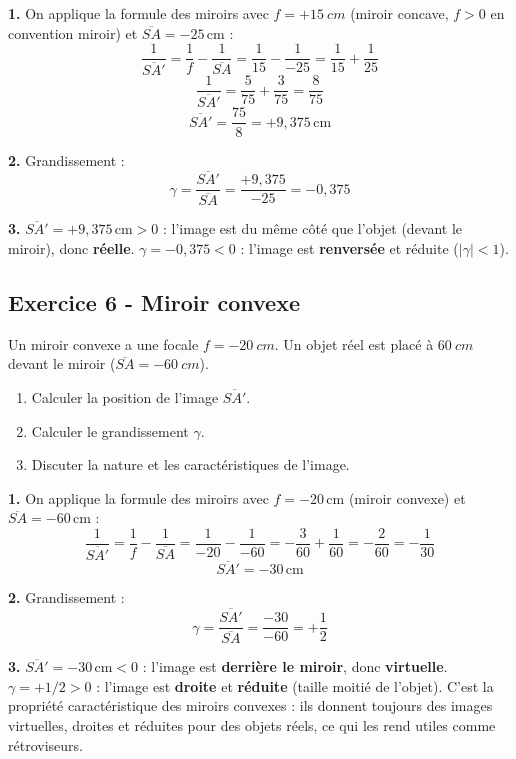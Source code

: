 \documentclass[12pt,a4paper]{article}
\begin{document}
\begin{boitecorrige}
\textbf{1.} On applique la formule des miroirs avec $f = +\qty{15}{cm}$ (miroir concave, $f > 0$ en convention miroir) et $\overline{SA} = -25\,\text{cm}$ :
\[
\frac{1}{\overline{SA'}} = \frac{1}{f} - \frac{1}{\overline{SA}} = \frac{1}{15} - \frac{1}{-25} = \frac{1}{15} + \frac{1}{25}
\]
\[
\frac{1}{\overline{SA'}} = \frac{5}{75} + \frac{3}{75} = \frac{8}{75}
\]
\[
\overline{SA'} = \frac{75}{8} = +9{,}375\,\text{cm}
\]

\textbf{2.} Grandissement :
\[
\gamma = \frac{\overline{SA'}}{\overline{SA}} = \frac{+9{,}375}{-25} = -0{,}375
\]

\textbf{3.} $\overline{SA'} = +9{,}375\,\text{cm} > 0$ : l'image est du même côté que l'objet (devant le miroir), donc \textbf{réelle}. $\gamma = -0{,}375 < 0$ : l'image est \textbf{renversée} et réduite ($|\gamma| < 1$).
\end{boitecorrige}

\subsection*{Exercice 6 - Miroir convexe \niveau{\moyen}}

\begin{boiteexercice}
Un miroir convexe a une focale $f = -\qty{20}{cm}$. Un objet réel est placé à $\qty{60}{cm}$ devant le miroir ($\overline{SA} = -\qty{60}{cm}$).
\begin{enumerate}
  \item Calculer la position de l'image $\overline{SA'}$.
  \item Calculer le grandissement $\gamma$.
  \item Discuter la nature et les caractéristiques de l'image.
\end{enumerate}
\end{boiteexercice}

\begin{boitecorrige}
\textbf{1.} On applique la formule des miroirs avec $f = -20\,\text{cm}$ (miroir convexe) et $\overline{SA} = -60\,\text{cm}$ :
\[
\frac{1}{\overline{SA'}} = \frac{1}{f} - \frac{1}{\overline{SA}} = \frac{1}{-20} - \frac{1}{-60} = -\frac{3}{60} + \frac{1}{60} = -\frac{2}{60} = -\frac{1}{30}
\]
\[
\boxed{\overline{SA'} = -30\,\text{cm}}
\]

\textbf{2.} Grandissement :
\[
\gamma = \frac{\overline{SA'}}{\overline{SA}} = \frac{-30}{-60} = +\frac{1}{2}
\]

\textbf{3.} $\overline{SA'} = -30\,\text{cm} < 0$ : l'image est \textbf{derrière le miroir}, donc \textbf{virtuelle}. $\gamma = +1/2 > 0$ : l'image est \textbf{droite} et \textbf{réduite} (taille moitié de l'objet). C'est la propriété caractéristique des miroirs convexes : ils donnent toujours des images virtuelles, droites et réduites pour des objets réels, ce qui les rend utiles comme rétroviseurs.
\end{boitecorrige}
\end{document}

